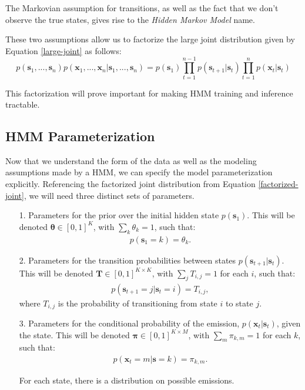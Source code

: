           \begin{warning}
            The Markovian assumption for transitions, as well as the fact that we don't observe the true states, gives rise to the \textit{Hidden Markov Model} name.
          \end{warning}

          These two assumptions allow us to factorize the large joint distribution given by Equation \ref{large-joint} as follows:
\begin{equation} \label{factorized-joint}
	p(\textbf{s}_1, ..., \textbf{s}_n) p(\textbf{x}_1, ..., \textbf{x}_n | \textbf{s}_1, ..., \textbf{s}_n) = p(\textbf{s}_1) \prod_{t=1}^{n-1} p(\textbf{s}_{t+1} | \textbf{s}_t) \prod_{t=1}^{n} p(\textbf{x}_t | \textbf{s}_t)
      \end{equation}
      
This factorization will prove important for making HMM training and inference tractable.

\subsection{HMM Parameterization}

Now that we understand the form of the data as well as the modeling assumptions made by a HMM, we can specify the model parameterization explicitly. Referencing the factorized joint distribution from Equation \ref{factorized-joint}, we will need three distinct sets of parameters.
%
\begin{itemize}
	\item[1.]  Parameters for the prior over the initial hidden state $p(\textbf{s}_1)$. This will be denoted $\boldsymbol{\theta} \in [0,1]^{K}$, with $\sum_k\theta_k=1$, such that:
	\begin{align*}
		p(\textbf{s}_1 = k) = \theta_k.
	\end{align*}
%
	\item[2.] Parameters for the transition probabilities between states $p(\textbf{s}_{t+1} | \textbf{s}_t)$. This will be denoted $\textbf{T} \in [0,1]^{K \times K}$, with $\sum_j T_{i,j}=1$ for each $i$, such that:
	\begin{align*}
		p(\textbf{s}_{t+1} = j | \textbf{s}_t = i) = T_{i,j},
	\end{align*}
	where $T_{i,j}$ is the probability of transitioning from state $i$ to state $j$.
%
	\item[3.] Parameters for the conditional probability of the emission, $p(\textbf{x}_t | \textbf{s}_t)$,  given the state. This will be denoted $\boldsymbol{\pi} \in [0,1]^{K \times M}$, with $\sum_m \pi_{k,m}=1$ for each $k$, such that:
	\begin{align*}
		p(\textbf{x}_t = m | \textbf{s} = k) = \pi_{k, m}.
	\end{align*}

	For each state, there is a distribution on possible emissions.
\end{itemize}

